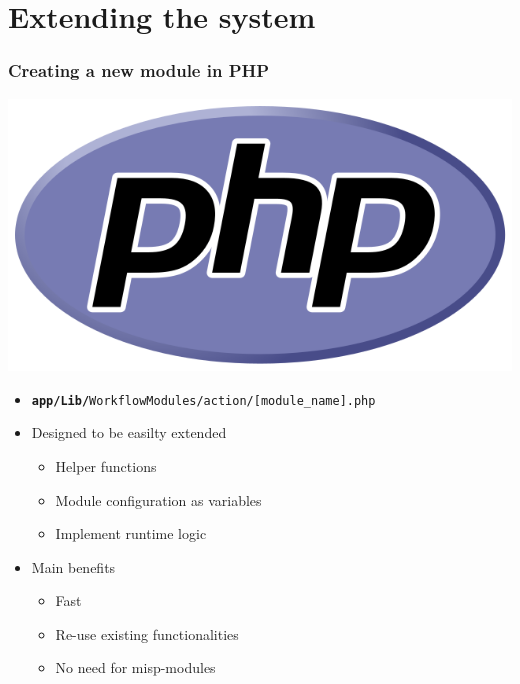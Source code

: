\section{Extending the system}
\begin{frame}
    \frametitle{Creating a new module in PHP}
    \begin{center}
        \includegraphics[scale=0.07]{pictures/PHP-logo.png}
    \end{center}
    \vspace*{2em}
    \begin{itemize}
        \item \texttt{\small \textbf{app/Lib/}WorkflowModules/action/[module\_name].php}
        \item Designed to be easilty extended
        \begin{itemize}
            \item Helper functions
            \item Module configuration as variables
            \item Implement runtime logic
        \end{itemize}
        \item Main benefits
        \begin{itemize}
            \item Fast
            \item Re-use existing functionalities
            \item No need for misp-modules
        \end{itemize}
    \end{itemize}
\end{frame}

